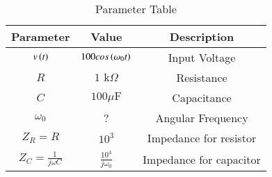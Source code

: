 \begin{table}[ht]
	  \centering
	    \begin{tabular}{|c|c|c|}
		        \hline
			   \textbf{ Parameter} & \textbf{Value} & \textbf{Description} \\
			       \hline
			           $v\left(t\right)$ & $100cos\left(\omega_0 t\right)$ & Input Voltage \\
				       \hline
				           $R$ & $1\text{ k}\Omega$ & Resistance \\
					       \hline
					           $C$ & $100\mu\text{F}$ & Capacitance \\
						       \hline
						           $\omega_0$ & ? & Angular Frequency  \\
							       \hline
							           $Z_R = R$ & $10^3$ & Impedance for resistor  \\
								       \hline
								           $Z_C = \frac{1}{j\omega C}$ & $\frac{10^{4}}{j\omega_0}$ & Impedance for capacitor  \\
									       \hline
									         \end{tabular}
										   \vspace{2mm}
										     \caption{Parameter Table}
										       \label{BM_23_32}
\end{table}
